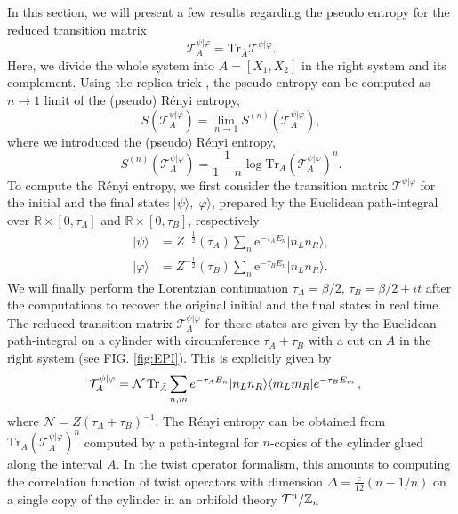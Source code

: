 \documentclass[%
twocolumn, 
secnumarabic,amssymb, preprintnumbers, superscriptaddress, aps, prl]{revtex4-1}
\newcommand{\be}{\begin{equation}}
\newcommand{\ee}{\end{equation}}
\begin{document}
In this section, we will present a few results regarding the pseudo entropy for the reduced transition matrix
\begin{equation}
\mathcal{T}^{\psi|\varphi}_A=\mathrm{Tr}_{\bar{A}}\mathcal{T}^{\psi|\varphi}.
\end{equation}
Here, we divide the whole system into $A=[X_1,X_2]$ in the right system and its complement.
Using the replica trick \cite{Calabrese:2004eu}, the pseudo entropy can be computed as $n\rightarrow 1$ limit of the (pseudo) R\'enyi entropy, %
\be
S(\mathcal{T}^{\psi|\varphi}_A)=\lim_{n\rightarrow1}S^{(n)}(\mathcal{T}^{\psi|\varphi}_A),
\ee
where we introduced the (pseudo) R\'enyi entropy,
\be
S^{(n)}(\mathcal{T}^{\psi|\varphi}_A)=\dfrac{1}{1-n}\log\mathrm{Tr}_A(\mathcal{T}^{\psi|\varphi}_A)^n.
\ee
To compute the R\'enyi entropy, we first consider the transition matrix $\mathcal{T}^{\psi|\varphi}$  for the initial and the final states $|\psi\rangle,|\varphi\rangle$, prepared by the Euclidean path-integral over $\mathbb{R}\times [0,\tau_A]$ and $\mathbb{R}\times [0,\tau_B]$, respectively
\begin{align}
    |\psi\rangle &=Z^{-\frac{1}{2}}(\tau_A)\sum_n\mathrm{e}^{-\tau_A E_n}|n_Ln_R\rangle,\\
    |\varphi\rangle&=Z^{-\frac{1}{2}}(\tau_B)\sum_n\mathrm{e}^{-\tau_B E_n}|n_Ln_R\rangle.
\end{align}
We will finally perform the Lorentzian continuation $\tau_A=\beta/2$, $\tau_B=\beta/2+it$  after the computations to recover the original initial and the final states in real time.
The reduced transition matrix $\mathcal{T}^{\psi|\varphi}_A$ for  these states are given by the Euclidean path-integral on a cylinder with circumference $\tau_A+\tau_B$ with a cut on $A$ in the right system (see FIG. \ref{fig:EPI}). This is explicitly given by
\begin{align}
\mathcal{T}^{\psi|\varphi}_A&=\mathcal{N}\,{\rm Tr}_{\bar{A}}\sum_{n,m}{e}^{-\tau_A E_n}|n_Ln_R\rangle \langle m_Lm_R|{e}^{-\tau_B E_m}\,,
\end{align}
where $\mathcal{N}=Z(\tau_A+\tau_B)^{-1}$. The R\'enyi entropy can be obtained from $\mathrm{Tr}_A(\mathcal{T}^{\psi|\varphi}_A)^n$ computed by a path-integral for $n$-copies of the cylinder glued along the interval $A$. In the twist operator formalism, this amounts to computing the correlation function of twist operators with dimension $\Delta=\frac{c}{12}(n-1/n)$ on a single copy of the cylinder in an orbifold theory ${\cal T}^n/\mathbb{Z}_n$
\end{document}
